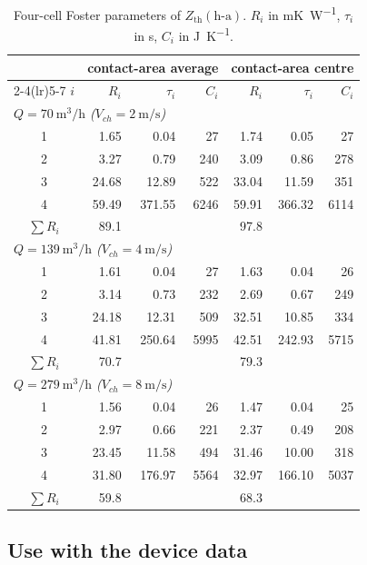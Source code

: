 \documentclass[11pt,a4paper]{article}
\newcommand{\Zth}{Z_{\mathrm{th}}}
\begin{document}
\begin{table}[htbp]
\centering\small
\caption{Four-cell Foster parameters of $\Zth(\mathrm{h\text{-}a})$. $R_i$ in \si{\milli\kelvin\per\watt}, $\tau_i$ in \si{\second}, $C_i$ in \si{\joule\per\kelvin}.}
\label{tab:foster}
\begin{tabular}{c rrr rrr}
\toprule
 & \multicolumn{3}{c}{contact-area average} & \multicolumn{3}{c}{contact-area centre} \\
\cmidrule(lr){2-4}\cmidrule(lr){5-7}
$i$ & $R_i$ & $\tau_i$ & $C_i$ & $R_i$ & $\tau_i$ & $C_i$ \\
\midrule
\multicolumn{7}{l}{\emph{$Q=\SI{70}{\cubic\metre\per\hour}$ ($V_{ch}=\SI{2}{\metre\per\second}$)}}\\
1 & 1.65 & 0.04 & 27 & 1.74 & 0.05 & 27 \\
2 & 3.27 & 0.79 & 240 & 3.09 & 0.86 & 278 \\
3 & 24.68 & 12.89 & 522 & 33.04 & 11.59 & 351 \\
4 & 59.49 & 371.55 & 6246 & 59.91 & 366.32 & 6114 \\
\midrule
$\sum R_i$ & 89.1 & & & 97.8 & & \\
\midrule
\multicolumn{7}{l}{\emph{$Q=\SI{139}{\cubic\metre\per\hour}$ ($V_{ch}=\SI{4}{\metre\per\second}$)}}\\
1 & 1.61 & 0.04 & 27 & 1.63 & 0.04 & 26 \\
2 & 3.14 & 0.73 & 232 & 2.69 & 0.67 & 249 \\
3 & 24.18 & 12.31 & 509 & 32.51 & 10.85 & 334 \\
4 & 41.81 & 250.64 & 5995 & 42.51 & 242.93 & 5715 \\
\midrule
$\sum R_i$ & 70.7 & & & 79.3 & & \\
\midrule
\multicolumn{7}{l}{\emph{$Q=\SI{279}{\cubic\metre\per\hour}$ ($V_{ch}=\SI{8}{\metre\per\second}$)}}\\
1 & 1.56 & 0.04 & 26 & 1.47 & 0.04 & 25 \\
2 & 2.97 & 0.66 & 221 & 2.37 & 0.49 & 208 \\
3 & 23.45 & 11.58 & 494 & 31.46 & 10.00 & 318 \\
4 & 31.80 & 176.97 & 5564 & 32.97 & 166.10 & 5037 \\
\midrule
$\sum R_i$ & 59.8 & & & 68.3 & & \\
\bottomrule
\end{tabular}
\end{table}

\subsection{Use with the device data}
\end{document}
